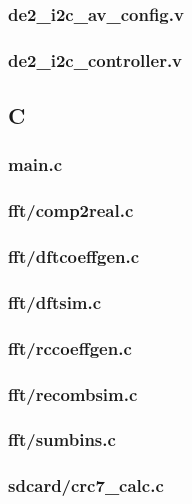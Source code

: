 \documentclass{article}
\begin{document}
	\subsubsection{de2\_i2c\_av\_config.v}
	
	\subsubsection{de2\_i2c\_controller.v}
	

\subsection{C}
	\subsubsection{main.c}
	
	\subsubsection{fft/comp2real.c}
	
	\subsubsection{fft/dftcoeffgen.c}
	
	\subsubsection{fft/dftsim.c}
	
	\subsubsection{fft/rccoeffgen.c}
	
	\subsubsection{fft/recombsim.c}
	
	\subsubsection{fft/sumbins.c}
	
	\subsubsection{sdcard/crc7\_calc.c}
	
\end{document}
